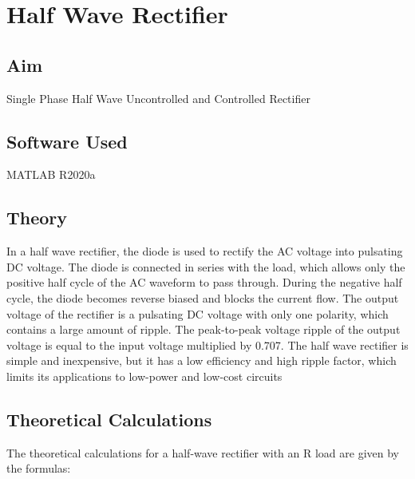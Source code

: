 \chapter{Half Wave Rectifier}
\vspace{-1cm}

\section{Aim}
\hspace{1cm}Single Phase Half Wave Uncontrolled and Controlled Rectifier

\section{Software Used}
\hspace{1cm}MATLAB R2020a
\section{Theory}
\hspace{\parindent}

In a half wave rectifier, the diode is used to rectify the AC voltage into pulsating DC voltage. The diode is connected in series with the load, which allows only the positive half cycle of the AC waveform to pass through. During the negative half cycle, the diode becomes reverse biased and blocks the current flow. The output voltage of the rectifier is a pulsating DC voltage with only one polarity, which contains a large amount of ripple. The peak-to-peak voltage ripple of the output voltage is equal to the input voltage multiplied by 0.707. The half wave rectifier is simple and inexpensive, but it has a low efficiency and high ripple factor, which limits its applications to low-power and low-cost circuits



\section{Theoretical Calculations}
\hspace{\parindent}
The theoretical calculations for a half-wave rectifier with an R load are given by the formulas:


